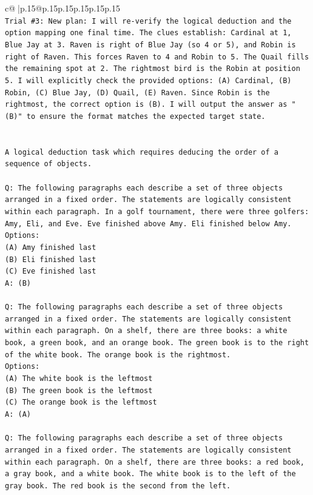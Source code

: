 \documentclass{article}
\begin{document}
{\begin{supertabular}{c@{$\;$}|p{.15\linewidth}@{}p{.15\linewidth}p{.15\linewidth}p{.15\linewidth}p{.15\linewidth}p{.15\linewidth}}
{{{\\ 
\texttt{Trial \#3: New plan: I will re{-}verify the logical deduction and the option mapping one final time. The clues establish: Cardinal at 1, Blue Jay at 3. Raven is right of Blue Jay (so 4 or 5), and Robin is right of Raven. This forces Raven to 4 and Robin to 5. The Quail fills the remaining spot at 2. The rightmost bird is the Robin at position 5. I will explicitly check the provided options: (A) Cardinal, (B) Robin, (C) Blue Jay, (D) Quail, (E) Raven. Since Robin is the rightmost, the correct option is (B). I will output the answer as "(B)" to ensure the format matches the expected target state.} \\
\\ 
\\ 
\texttt{A logical deduction task which requires deducing the order of a sequence of objects.} \\
\\ 
\texttt{Q: The following paragraphs each describe a set of three objects arranged in a fixed order. The statements are logically consistent within each paragraph. In a golf tournament, there were three golfers: Amy, Eli, and Eve. Eve finished above Amy. Eli finished below Amy.} \\
\texttt{Options:} \\
\texttt{(A) Amy finished last} \\
\texttt{(B) Eli finished last} \\
\texttt{(C) Eve finished last} \\
\texttt{A: (B)} \\
\\ 
\texttt{Q: The following paragraphs each describe a set of three objects arranged in a fixed order. The statements are logically consistent within each paragraph. On a shelf, there are three books: a white book, a green book, and an orange book. The green book is to the right of the white book. The orange book is the rightmost.} \\
\texttt{Options:} \\
\texttt{(A) The white book is the leftmost} \\
\texttt{(B) The green book is the leftmost} \\
\texttt{(C) The orange book is the leftmost} \\
\texttt{A: (A)} \\
\\ 
\texttt{Q: The following paragraphs each describe a set of three objects arranged in a fixed order. The statements are logically consistent within each paragraph. On a shelf, there are three books: a red book, a gray book, and a white book. The white book is to the left of the gray book. The red book is the second from the left.} \\
}}}
\end{supertabular}}
\end{document}
